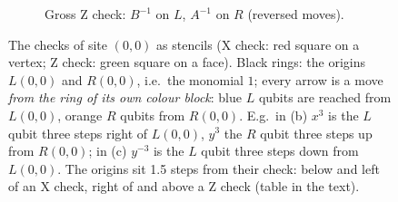 \documentclass[11pt]{article}
\newcommand{\Lpos}[2]{({#1}, {#2})}
\newcommand{\Rpos}[2]{({#1-1.5}, {#2+1.5})}
\newcommand{\Zpos}[2]{({#1-1.5}, {#2})}
\newcommand{\latwin}[4]{%
  \foreach \xx in {#1,...,#2} \draw[lat] (\xx,#3-0.3) -- (\xx,#4+0.3);
  \foreach \yy in {#3,...,#4} \draw[lat] (#1-0.3,\yy+0.5) -- (#2+0.3,\yy+0.5);}
\begin{document}
\begin{figure}[h]
\begin{subfigure}{0.37\textwidth}
\caption{Gross Z check: $B^{-1}$ on $L$, $A^{-1}$ on $R$ (reversed moves).}
\end{subfigure}
\caption{The checks of site $(0,0)$ as stencils (X check: red square on a vertex; Z check: green
square on a face). Black rings: the origins $L(0,0)$ and $R(0,0)$, i.e.\ the monomial $1$; every
arrow is a move \emph{from the ring of its own colour block}: blue $L$ qubits are reached from
$L(0,0)$, orange $R$ qubits from $R(0,0)$. E.g.\ in (b) $x^3$ is the $L$ qubit three steps right of
$L(0,0)$, $y^3$ the $R$ qubit three steps up from $R(0,0)$; in (c) $y^{-3}$ is the $L$ qubit three
steps down from $L(0,0)$. The origins sit 1.5 steps from their check: below and left of an X
check, right of and above a Z check (table in the text).}
\label{fig:stencil}
\end{figure}
\end{document}
